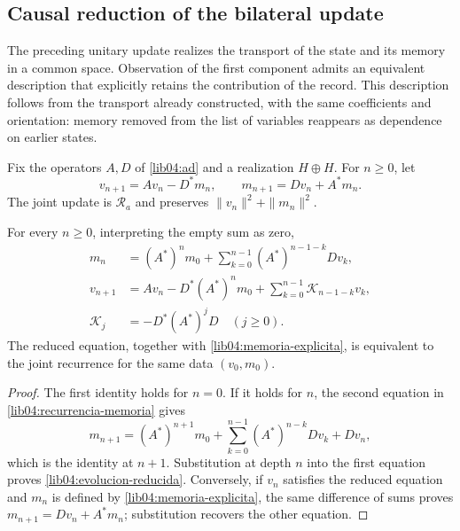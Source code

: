 \subsection{Causal reduction of the bilateral update}
\label{lib04:reduccion-causal}

The preceding unitary update realizes the transport of the state and its
memory in a common space. Observation of the first component admits an
equivalent description that explicitly retains the contribution of the
record. This description follows from the transport already constructed,
with the same coefficients and orientation: memory removed from the list
of variables reappears as dependence on earlier states.

Fix the operators \(A,D\) of \eqref{lib04:ad} and a realization
\(H\oplus H\). For \(n\geq0\), let
\begin{equation}
 v_{n+1}=Av_n-D^*m_n,\qquad
 m_{n+1}=Dv_n+A^*m_n.
 \label{lib04:recurrencia-memoria}
\end{equation}
The joint update is \(\mathscr R_a\) and preserves
\(\|v_n\|^2+\|m_n\|^2\).

\begin{proposition}
\label{lib04:prop-memoria-reducida}
For every \(n\geq0\), interpreting the empty sum as zero,
\begin{align}
 m_n&=(A^*)^n m_0+
       \sum_{k=0}^{n-1}(A^*)^{n-1-k}Dv_k,
       \label{lib04:memoria-explicita}\\
 v_{n+1}&=Av_n-D^*(A^*)^n m_0
       +\sum_{k=0}^{n-1}\mathscr K_{n-1-k}v_k,
       \label{lib04:evolucion-reducida}\\
 \mathscr K_j&=-D^*(A^*)^jD\quad(j\geq0).
       \label{lib04:nucleo-retardo}
\end{align}
The reduced equation, together with \eqref{lib04:memoria-explicita}, is
equivalent to the joint recurrence for the same data \((v_0,m_0)\).
\end{proposition}
\begin{proof}
The first identity holds for \(n=0\). If it holds for \(n\), the second
equation in \eqref{lib04:recurrencia-memoria} gives
\[
 m_{n+1}=(A^*)^{n+1}m_0+
 \sum_{k=0}^{n-1}(A^*)^{n-k}Dv_k+Dv_n,
\]
which is the identity at \(n+1\). Substitution at depth \(n\) into the
first equation proves \eqref{lib04:evolucion-reducida}. Conversely, if
\(v_n\) satisfies the reduced equation and \(m_n\) is defined by
\eqref{lib04:memoria-explicita}, the same difference of sums proves
\(m_{n+1}=Dv_n+A^*m_n\); substitution recovers the other equation.
\end{proof}

